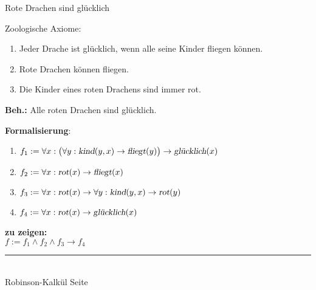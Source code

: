 \documentclass{slides}
\newcommand{\myrule}{\rule{20cm}{1mm}\\ }
\newcounter{mypage}
\begin{document}
\begin{slide}{}
\normalsize
\begin{center}
Rote Drachen sind gl\"{u}cklich 
\end{center}
\vspace{0.5cm}

\footnotesize
Zoologische Axiome:
\begin{enumerate}
\item Jeder Drache ist gl\"{u}cklich, wenn alle seine Kinder fliegen k\"{o}nnen.
\item Rote Drachen k\"{o}nnen fliegen.
\item Die Kinder eines roten Drachens sind immer rot.
\end{enumerate}
\textbf{Beh.:} Alle roten Drachen sind gl\"{u}cklich.

\textbf{Formalisierung}:
\begin{enumerate}
\item $f_1 := \forall x: \big(\forall y: \textsl{kind}(y,x) \rightarrow \textsl{fliegt}(y)\big) \rightarrow \textsl{gl\"{u}cklich}(x)$
\item $f_2 := \forall x: \textsl{rot}(x) \rightarrow \textsl{fliegt}(x)$
\item $f_3 := \forall x: \textsl{rot}(x) \rightarrow \forall y: \textsl{kind}(y,x) \rightarrow \textsl{rot}(y)$
\item $f_4 := \forall x: \textsl{rot}(x) \rightarrow \textsl{gl\"{u}cklich}(x)$
\end{enumerate}
\textbf{zu zeigen:} \\[0.1cm]
\hspace*{1.3cm} $f := f_1 \wedge f_2 \wedge f_3 \rightarrow f_4$ \\[0.1cm]


\vspace*{\fill}
\tiny \addtocounter{mypage}{1}
\myrule
Robinson-Kalk\"{u}l \hspace*{\fill} Seite 
\end{slide}

\end{document}
